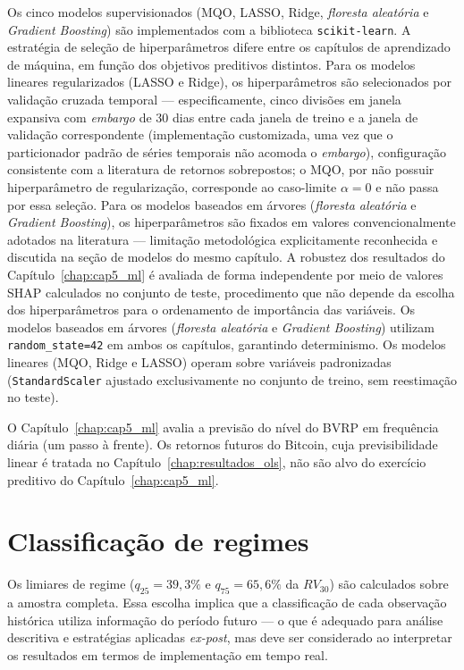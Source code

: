 Os cinco modelos supervisionados (MQO, LASSO, Ridge, \textit{floresta aleatória} e \textit{Gradient Boosting}) são implementados com a biblioteca \texttt{scikit-learn}. A estratégia de seleção de hiperparâmetros difere entre os capítulos de aprendizado de máquina, em função dos objetivos preditivos distintos. Para os modelos lineares regularizados (LASSO e Ridge), os hiperparâmetros são selecionados por validação cruzada temporal --- especificamente, cinco divisões em janela expansiva com \textit{embargo} de 30 dias entre cada janela de treino e a janela de validação correspondente (implementação customizada, uma vez que o particionador padrão de séries temporais não acomoda o \textit{embargo}), configuração consistente com a literatura de retornos sobrepostos; o MQO, por não possuir hiperparâmetro de regularização, corresponde ao caso-limite $\alpha = 0$ e não passa por essa seleção. Para os modelos baseados em árvores (\textit{floresta aleatória} e \textit{Gradient Boosting}), os hiperparâmetros são fixados em valores convencionalmente adotados na literatura --- limitação metodológica explicitamente reconhecida e discutida na seção de modelos do mesmo capítulo. A robustez dos resultados do Capítulo~\ref{chap:cap5_ml} é avaliada de forma independente por meio de valores SHAP calculados no conjunto de teste, procedimento que não depende da escolha dos hiperparâmetros para o ordenamento de importância das variáveis. Os modelos baseados em árvores (\textit{floresta aleatória} e \textit{Gradient Boosting}) utilizam \texttt{random\_state=42} em ambos os capítulos, garantindo determinismo. Os modelos lineares (MQO, Ridge e LASSO) operam sobre variáveis padronizadas (\texttt{StandardScaler} ajustado exclusivamente no conjunto de treino, sem reestimação no teste).

O Capítulo~\ref{chap:cap5_ml} avalia a previsão do nível do BVRP em frequência diária (um passo à frente). Os retornos futuros do Bitcoin, cuja previsibilidade linear é tratada no Capítulo~\ref{chap:resultados_ols}, não são alvo do exercício preditivo do Capítulo~\ref{chap:cap5_ml}.

\section*{Classificação de regimes}

Os limiares de regime ($q_{25} = 39{,}3\%$ e $q_{75} = 65{,}6\%$ da $RV_{30}$)
são calculados sobre a amostra completa. Essa escolha implica que a
classificação de cada observação histórica utiliza informação do período futuro
--- o que é adequado para análise descritiva e estratégias aplicadas
\textit{ex-post}, mas deve ser considerado ao interpretar os resultados em
termos de implementação em tempo real.

